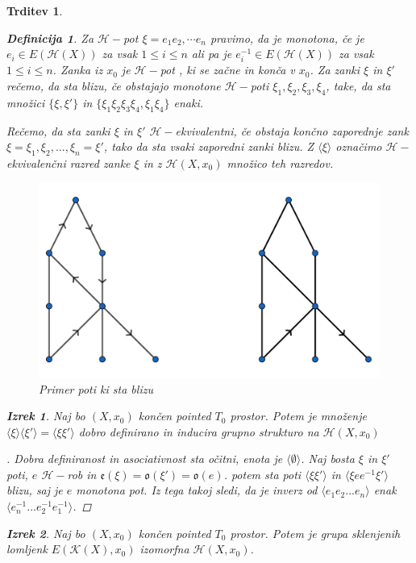 \documentclass[a4paper,12pt]{article}
\DeclareRobustCommand{\k}{
    \mathcal{K}
}
\DeclareRobustCommand{\h}{
    \mathcal{H}
}
\DeclareRobustCommand{\pot}{
    $\h-$pot
}
\theoremstyle{definition}
\newtheorem{definicija}{Definicija}
\theoremstyle{plain}
\newtheorem{izrek}{Izrek}
\theoremstyle{definition}
\theoremstyle{plain}
\newtheorem{trditev}{Trditev}
\theoremstyle{plain}
\theoremstyle{plain}
\theoremstyle{plain}
\newenvironment{dokaz}{\begin{proof}[\bfseries\upshape\proofname]}{\end{proof}}
\begin{document}
\begin{trditev}
\begin{definicija}
 Za \pot $\xi=e_1e_2,\cdots e_n$ pravimo, da je \textit{monotona}, če je $e_i\in 
 E(\h(X))$ za vsak $1\leq i \leq n$ ali pa je $e_i^{-1}\in E(\h(X))$ za vsak $1\leq i \leq n$.
 \textit{Zanka} iz $x_0$ je \pot, ki se začne in konča v $x_0$. Za zanki $\xi$ in
  $\xi'$ rečemo, da sta blizu, če obstajajo monotone $\h-$poti $\xi_1,\xi_2,\xi_3,\xi_4$,
   take, da  sta množici $\{\xi,\xi'\}$ in $\{\xi_1\xi_2\xi_3\xi_4,\xi_1\xi_4\}$ enaki.

   Rečemo, da sta zanki $\xi$ in $\xi'$ $\h-$ekvivalentni, če obstaja končno zaporednje zank $\xi=\xi_1,\xi_2,...,\xi_n=\xi'$, tako da sta vsaki zaporedni zanki blizu. Z $\langle\xi\rangle$ označimo $\h-$ ekvivalenčni razred zanke $\xi$ in z $\mathscr{H}(X,x_0)$ množico teh razredov.
\end{definicija}

    \begin{figure}[h!]
          \centering
          \includegraphics[width=0.6\linewidth]{poti.png}
        \caption{Primer poti ki sta blizu}
        \end{figure}

\begin{izrek}
    Naj bo $(X,x_0)$ končen pointed $T_0$ prostor. Potem je množenje $\langle\xi\rangle\langle\xi'\rangle=\langle\xi\xi'\rangle$ dobro definirano in inducira grupno strukturo na $\mathscr{H}(X,x_0)$
\end{izrek}

\begin{dokaz}
    Dobra definiranost in asociativnost sta očitni, enota je $\langle\emptyset\rangle$. Naj bosta $\xi$ in $\xi'$ poti, $e$ $\h-$rob in $\mathfrak{e}(\xi)=\mathfrak{o}(\xi')=\mathfrak{o}(e)$. potem sta poti $\langle\xi \xi'\rangle$ in $\langle\xi e e^{-1} \xi'\rangle$ blizu, saj je $e$ monotona pot. Iz tega takoj sledi, da je inverz od $\langle e_1 e_2...e_n\rangle$ enak $\langle e_n^{-1}...e_2^{-1}e_1^{-1}\rangle$.
\end{dokaz}


\begin{izrek}
    Naj bo $(X,x_0)$ končen pointed $T_0$ prostor. Potem je grupa sklenjenih lomljenk $E(\k(X),x_0)$ izomorfna $\mathscr{H}(X,x_0)$.
\end{izrek}


\end{trditev}
\end{document}

